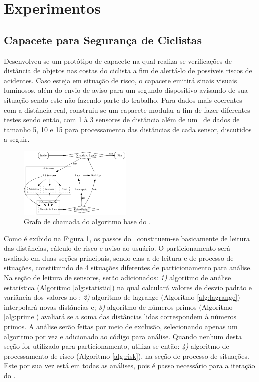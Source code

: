 \section{Experimentos}

    \subsection{Capacete para Segurança de Ciclistas}
        Desenvolveu-se um protótipo de capacete na qual realiza-se verificações de distância de objetos nas costas do ciclista a fim de alertá-lo de possíveis riscos de acidentes.
        Caso esteja em situação de risco, o capacete emitirá sinais visuais luminosos, além do envio de aviso para um segundo dispositivo avisando de sua situação sendo este não fazendo parte do trabalho.
        Para dados mais coerentes com a distância real, construiu-se um capacete modular a fim de fazer diferentes testes sendo então, com 1 à 3 sensores de distância além de um \buffer\ de dados de tamanho 5, 10 e 15 para processamento das distâncias de cada sensor, discutidos a seguir.
        
        \begin{figure}[h] \centering
            \vspace{-0.5em}
            \includegraphics[width=0.48\textwidth]{img/capacete.png}
            \caption{Grafo de chamada do algoritmo base do \wearable.}
            \label{fig:gc}
        \end{figure}
        
        Como é exibido na Figura \ref{fig:gc}, os passos do \wearable\ constituem-se basicamente de leitura das distâncias, cálculo de risco e aviso ao usuário.
        O particionamento será avaliado em duas seções principais, sendo elas a de leitura e de processo de situações, constituindo de 4 situações diferentes de particionamento para análise.
        Na seção de leitura de sensores, serão adicionados: \textit{1)} algoritmo de análise estatística (Algoritmo \ref{alg:statistic}) na qual calculará valores de desvio padrão e variância dos valores no \buffer; \textit{2)} algoritmo de lagrange (Algoritmo \ref{alg:lagrange}) interpolará novas distâncias e; \textit{3)} algoritmo de números primos (Algoritmo \ref{alg:prime}) avaliará se a soma das distâncias lidas correspondem à números primos.
        A análise serão feitas por meio de exclusão, selecionando apenas um algoritmo por vez e adicionado ao código para análise.
        Quando nenhum desta seção for utilizado para particionamento, utiliza-se então: \textit{4)} algoritmo de processamento de risco (Algoritmo \ref{alg:risk}), na seção de processo de situações.
        Este por sua vez está em todas as análises, pois é passo necessário para a iteração do \wearable.
        
